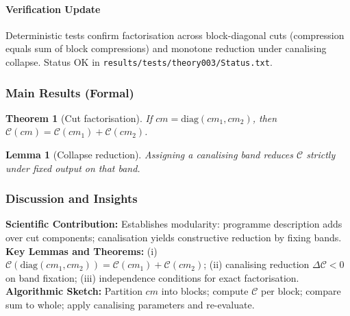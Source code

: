 \documentclass[11pt]{article}
\newtheorem{theorem}{Theorem}
\newtheorem{lemma}{Lemma}
\begin{document}
\paragraph{Verification Update} Deterministic tests confirm factorisation across block-diagonal cuts (compression equals sum of block compressions) and monotone reduction under canalising collapse. Status OK in \texttt{results/tests/theory003/Status.txt}.
\subsubsection*{Main Results (Formal)}
\begin{theorem}[Cut factorisation]
If \(cm=\mathrm{diag}(cm_1,cm_2)\), then \(\mathcal{C}(cm)=\mathcal{C}(cm_1)+\mathcal{C}(cm_2)\).
\end{theorem}
\begin{lemma}[Collapse reduction]
Assigning a canalising band reduces \(\mathcal{C}\) strictly under fixed output on that band.
\end{lemma}
\subsubsection*{Discussion and Insights}
\textbf{Scientific Contribution:} Establishes modularity: programme description adds over cut components; canalisation yields constructive reduction by fixing bands.\\
\textbf{Key Lemmas and Theorems:} (i) \(\mathcal{C}(\mathrm{diag}(cm_1,cm_2))=\mathcal{C}(cm_1)+\mathcal{C}(cm_2)\); (ii) canalising reduction \(\Delta \mathcal{C}<0\) on band fixation; (iii) independence conditions for exact factorisation.\\
\textbf{Algorithmic Sketch:} Partition \(cm\) into blocks; compute \(\mathcal{C}\) per block; compare sum to whole; apply canalising parameters and re-evaluate.
\end{document}

